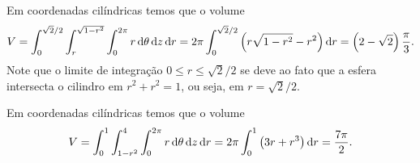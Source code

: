 \begin{questions}
\begin{solution}
\end{solution}



\begin{solution}
    Em coordenadas cilíndricas temos que o volume
    \begin{align*}
        V = \int_{0}^{\sqrt{2}/2}\int_{r}^{\sqrt{1-r^2}}\int_{0}^{2\pi} r\,\mathrm{d} \theta\,\mathrm{d} z\,\mathrm{d} r
            = 2\pi \int_{0}^{\sqrt{2}/2} \left( r\sqrt{1-r^2} - r^2 \right) \mathrm{d} r
            = \left(2-\sqrt{2}\right) \frac{\pi}{3}.
    \end{align*}
    Note que o limite de integração $0 \le r \le \sqrt{2}/2$ se deve ao fato que a esfera intersecta o cilindro em $r^2+r^2=1$, ou seja, em $r = \sqrt{2}/2$.
\end{solution}


\begin{solution}
    Em coordenadas cilíndricas temos que o volume
    \begin{align*}
        V = \int_{0}^{1} \int_{1-r^2}^{4}\int_{0}^{2\pi} r\,\mathrm{d} \theta\,\mathrm{d} z\,\mathrm{d} r
            = 2\pi \int_{0}^{1} \left( 3r+r^3 \right) \mathrm{d} r
            = \frac{7\pi}{2}.
    \end{align*}
\end{solution}

\end{questions}
